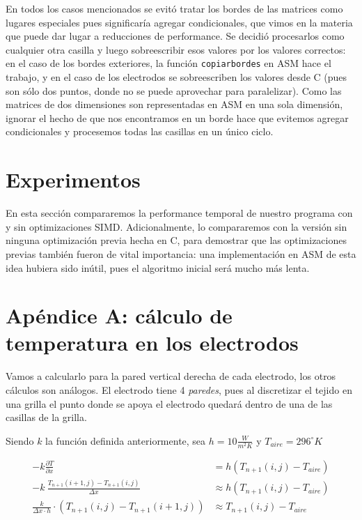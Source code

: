 \documentclass[a4paper]{article}
\begin{document}
En todos los casos mencionados se evitó tratar los bordes de las matrices como lugares especiales pues significaría agregar condicionales, que vimos en la materia que puede dar lugar a reducciones de performance. Se decidió procesarlos como cualquier otra casilla y luego sobreescribir esos valores por los valores correctos: en el caso de los bordes exteriores, la función \texttt{copiarbordes} en ASM hace el trabajo, y en el caso de los electrodos se sobreescriben los valores desde C (pues son sólo dos puntos, donde no se puede aprovechar para paralelizar). Como las matrices de dos dimensiones son representadas en ASM en una sola dimensión, ignorar el hecho de que nos encontramos en un borde hace que evitemos agregar condicionales y procesemos todas las casillas en un único ciclo.\\

\newpage
\section{Experimentos}

En esta sección compararemos la performance temporal de nuestro programa con y sin optimizaciones
SIMD. Adicionalmente, lo compararemos con la versión sin ninguna optimización previa hecha en C,
para demostrar que las optimizaciones previas también fueron de vital importancia: una implementación
en ASM de esta idea hubiera sido inútil, pues el algoritmo inicial será mucho más lenta. \\

\newpage
\section{Apéndice A: cálculo de temperatura en los electrodos}

Vamos a calcularlo para la pared vertical derecha de cada electrodo, los otros cálculos son análogos. El electrodo tiene 4 \textit{paredes}, pues al discretizar el tejido en una grilla el punto donde se apoya el electrodo quedará dentro de una de las casillas de la grilla.

Siendo $k$ la función definida anteriormente, sea $h = 10 \frac{W}{m^2 K}$ y $T_{aire} = 296 ^\circ K$

\begin{equation*}
\begin{aligned}
-k \frac{\partial T}{\partial x} & = h (T_{n+1}(i,j) -  T_{aire}) \\
-k \ \frac{T_{n+1}(i+1,j) - T_{n+1}(i,j)}{\Delta x} & \approx h (T_{n+1}(i,j) -  T_{aire}) \\
\frac{k}{\Delta x \cdot h} \cdot (T_{n+1}(i,j) - T_{n+1}(i+1,j)) & \approx T_{n+1}(i,j) -  T_{aire}
\end{aligned}
\end{equation*}
\end{document}
